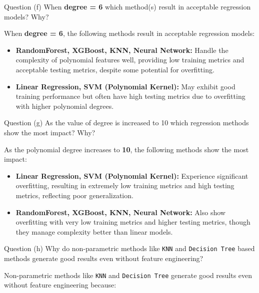\begin{customboxnew}[label={box:Q3f}]{Question (f)}
	When \textbf{degree = 6} which method(s) result in acceptable regression models? Why?
\end{customboxnew}

When \textbf{degree = 6}, the following methods result in acceptable regression models:

\begin{itemize}
    \item \textbf{RandomForest, XGBoost, KNN, Neural Network:} Handle the complexity of polynomial features well, providing low training metrics and acceptable testing metrics, despite some potential for overfitting.
    \item \textbf{Linear Regression, SVM (Polynomial Kernel):} May exhibit good training performance but often have high testing metrics due to overfitting with higher polynomial degrees.
\end{itemize}

\clearpage

\begin{customboxnew}[label={box:Q3g}]{Question (g)}
	As the value of degree is increased to 10 which regression methods show the most impact? Why?
\end{customboxnew}

As the polynomial degree increases to \textbf{10}, the following methods show the most impact:

\begin{itemize}
    \item \textbf{Linear Regression, SVM (Polynomial Kernel):} Experience significant overfitting, resulting in extremely low training metrics and high testing metrics, reflecting poor generalization.
    \item \textbf{RandomForest, XGBoost, KNN, Neural Network:} Also show overfitting with very low training metrics and higher testing metrics, though they manage complexity better than linear models.
\end{itemize}

\begin{customboxnew}[label={box:Q3h}]{Question (h)}
	Why do non-parametric methods like \verb|KNN| and \verb|Decision Tree| based methods generate good results even without feature engineering?
\end{customboxnew}

Non-parametric methods like \texttt{KNN} and \texttt{Decision Tree} generate good results even without feature engineering because:

